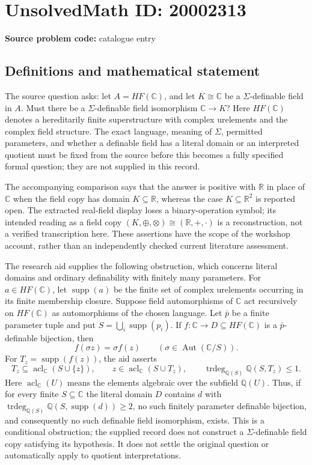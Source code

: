 \documentclass[11pt]{article}
\newcommand{\Q}{\mathbb{Q}}
\newcommand{\R}{\mathbb{R}}
\newcommand{\C}{\mathbb{C}}
\begin{document}
\section*{UnsolvedMath ID: 20002313}
\textbf{Source problem code:} catalogue entry
\subsection{Definitions and mathematical statement}
The source question asks: let $A=HF(\C)$, and let $K\cong\C$ be a $\Sigma$-definable field in $A$. Must there be a $\Sigma$-definable field isomorphism $\C\to K$? Here $HF(\C)$ denotes a hereditarily finite superstructure with complex urelements and the complex field structure. The exact language, meaning of $\Sigma$, permitted parameters, and whether a definable field has a literal domain or an interpreted quotient must be fixed from the source before this becomes a fully specified formal question; they are not supplied in this record.

The accompanying comparison says that the answer is positive with $\R$ in place of $\C$ when the field copy has domain $K\subseteq\R$, whereas the case $K\subseteq\R^2$ is reported open. The extracted real-field display loses a binary-operation symbol; its intended reading as a field copy $(K,\oplus,\otimes)\cong(\R,+,\cdot)$ is a reconstruction, not a verified transcription here. These assertions have the scope of the workshop account, rather than an independently checked current literature assessment.

The research aid supplies the following obstruction, which concerns literal domains and ordinary definability with finitely many parameters. For $a\in HF(\C)$, let $\operatorname{supp}(a)$ be the finite set of complex urelements occurring in its finite membership closure. Suppose field automorphisms of $\C$ act recursively on $HF(\C)$ as automorphisms of the chosen language. Let $\bar p$ be a finite parameter tuple and put $S=\bigcup_i\operatorname{supp}(p_i)$. If $f:\C\to D\subseteq HF(\C)$ is a $\bar p$-definable bijection, then
\[
f(\sigma z)=\sigma f(z)\qquad(\sigma\in\operatorname{Aut}(\C/S)).
\]
For $T_z=\operatorname{supp}(f(z))$, the aid asserts
\[
T_z\subseteq\operatorname{acl}_{\C}(S\cup\{z\}),\qquad
z\in\operatorname{acl}_{\C}(S\cup T_z),\qquad
\operatorname{trdeg}_{\Q(S)}\Q(S,T_z)\leq1.
\]
Here $\operatorname{acl}_{\C}(U)$ means the elements algebraic over the subfield $\Q(U)$. Thus, if for every finite $S\subseteq\C$ the literal domain $D$ contains $d$ with $\operatorname{trdeg}_{\Q(S)}\Q(S,\operatorname{supp}(d))\geq2$, no such finitely parameter definable bijection, and consequently no such definable field isomorphism, exists. This is a conditional obstruction; the supplied record does not construct a $\Sigma$-definable field copy satisfying its hypothesis. It does not settle the original question or automatically apply to quotient interpretations.
\end{document}
